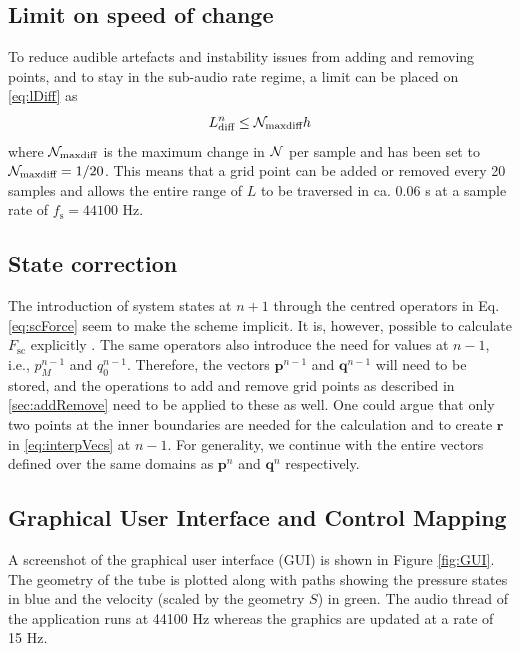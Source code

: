 \subsection{Limit on speed of change}\label{sec:limit}
To reduce audible artefacts and instability issues from adding and removing points, and to stay in the sub-audio rate regime, a limit can be placed on \eqref{eq:lDiff} as
\begin{equation}\label{eq:Nmaxdiff} 
    L_\text{diff}^n \leq \mathcal{N}_\text{maxdiff} h
\end{equation}
where $\mathcal{N}_\text{maxdiff}$ is the maximum change in $\mathcal{N}$ per sample and has been set to $\mathcal{N}_\text{maxdiff} = 1/20$. This means that a grid point can be added or removed every 20 samples and allows the entire range of $L$ to be traversed in ca. 0.06 s at a sample rate of $f_\text{s} = 44100$ Hz. 

\subsection{State correction}\label{sec:impStateCorr}
The introduction of system states at $n+1$ through the centred operators in Eq. \eqref{eq:scForce} seem to make the scheme implicit. It is, however, possible to calculate $F_\text{sc}$ explicitly \cite{bilbao2009, bilbao2009dafx}. The same operators also introduce the need for values at $n-1$, i.e., $p_{M}^{n-1}$ and $q_{0}^{n-1}$. Therefore, the vectors $\mathbf{p}^{n-1}$ and $\mathbf{q}^{n-1}$ will need to be stored, and the operations to add and remove grid points as described in \ref{sec:addRemove} need to be applied to these as well. One could argue that only two points at the inner boundaries are needed for the calculation and to create $\mathbf{r}$ in \eqref{eq:interpVecs} at $n-1$. For generality, we continue with the entire vectors defined over the same domains as $\mathbf{p}^n$ and $\mathbf{q}^n$ respectively. 

\subsection{Graphical User Interface and Control Mapping}
A screenshot of the graphical user interface (GUI) is shown in Figure \ref{fig:GUI}. The geometry of the tube is plotted along with paths showing the pressure states in blue and the velocity (scaled by the geometry $S$) in green. The audio thread of the application runs at 44100 Hz whereas the graphics are updated at a rate of 15 Hz. 

